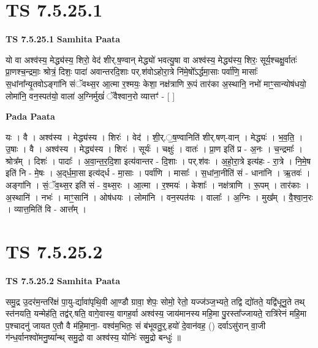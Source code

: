 \documentclass[17pt]{extarticle}
\begin{document}

\section{ TS 7.5.25.1 }

\textbf{TS 7.5.25.1 } \newline
\textbf{Samhita Paata} \newline

यो वा अश्व॑स्य॒ मेद्ध्य॑स्य॒ शिरो॒ वेद॑ शीर्.ष॒ण्वान् मेद्ध्यो॑ भवत्यु॒षा वा अश्व॑स्य॒ मेद्ध्य॑स्य॒ शिरः॒ सूर्य॒श्चक्षु॒र्वातः॑ प्रा॒णश्च॒न्द्रमाः॒ श्रोत्रं॒ दिशः॒ पादा॑ अवान्तरदि॒शाः पर्.श॑वोऽहोरा॒त्रे नि॑मे॒षो᳚ऽर्द्धमा॒साः पर्वा॑णि॒ मासाः᳚ स॒धांना᳚न्यृ॒तवोऽङ्गा॑नि संॅवथ्स॒र आ॒त्मा र॒श्मयः॒ केशा॒ नक्ष॑त्राणि रू॒पं तार॑का अ॒स्थानि॒ नभो॑ माꣳ॒॒सान्योष॑धयो॒ लोमा॑नि॒ वन॒स्पत॑यो॒ वाला॑ अ॒ग्निर्मुखं॑ ॅवैश्वान॒रो व्यात्तꣳ॑ - [  ] \newline

\textbf{Pada Paata} \newline

यः । वै । अश्व॑स्य । मेद्ध्य॑स्य । शिरः॑ । वेद॑ । शी॒र्.॒ष॒ण्वानिति॑ शीर्.षण्-वान् । मेद्ध्यः॑ । भ॒व॒ति॒ । उ॒षाः । वै । अश्व॑स्य । मेद्ध्य॑स्य । शिरः॑ । सूर्यः॑ । चक्षुः॑ । वातः॑ । प्रा॒ण इति॑ प्र - अ॒नः । च॒न्द्रमाः᳚ । श्रोत्र᳚म् । दिशः॑ । पादाः᳚ । अ॒वा॒न्त॒र॒दि॒शा इत्य॑वान्तर - दि॒शाः । पर्.श॑वः । अ॒हो॒रा॒त्रे इत्य॑हः - रा॒त्रे । नि॒मे॒ष इति॑ नि - मे॒षः । अ॒द्‌र्ध॒मा॒सा इत्य॑द्‌र्ध - मा॒साः । पर्वा॑णि । मासाः᳚ । स॒धांना॒नीति॑ सं - धाना॑नि । ऋ॒तवः॑ । अङ्गा॑नि । सं॒ॅव॒थ्स॒र इति॑ सं - व॒थ्स॒रः । आ॒त्मा । र॒श्मयः॑ । केशाः᳚ । नक्ष॑त्राणि । रू॒पम् । तार॑काः । अ॒स्थानि॑ । नभः॑ । माꣳ॒॒सानि॑ । ओष॑धयः । लोमा॑नि । वन॒स्पत॑यः । वालाः᳚ । अ॒ग्निः । मुख᳚म् । वै॒श्वा॒न॒रः । व्यात्त॒मिति॑ वि - आत्त᳚म् ।  \newline





\section{ TS 7.5.25.2 }

\textbf{TS 7.5.25.2 } \newline
\textbf{Samhita Paata} \newline

समु॒द्र उ॒दर॑म॒न्तरि॑क्षं पा॒यु-र्द्यावा॑पृथि॒वी आ॒ण्डौ ग्रावा॒ शेपः॒ सोमो॒ रेतो॒ यज्ज॑ञ्ज॒भ्यते॒ तद्वि द्यो॑तते॒ यद्वि॑धूनु॒ते तथ् स्त॑नयति॒ यन्मेह॑ति॒ तद्व॑र्.षति॒ वागे॒वास्य॒ वागह॒र्वा अश्व॑स्य॒ जाय॑मानस्य महि॒मा पु॒रस्ता᳚ज्जायते॒ रात्रि॑रेनं महि॒मा प॒श्चादनु॑ जायत ए॒तौ वै म॑हि॒माना॒- वश्व॑म॒भितः॒ सं ब॑भूवतु॒र्॒.हयो॑ दे॒वान॑वह॒ () दर्वाऽसु॑रान् वा॒जी ग॑न्ध॒र्वानश्वो॑मनु॒ष्या᳚न्थ् समु॒द्रो वा अश्व॑स्य॒ योनिः॑ समु॒द्रो बन्धुः॑ ॥ \newline
\end{document}
